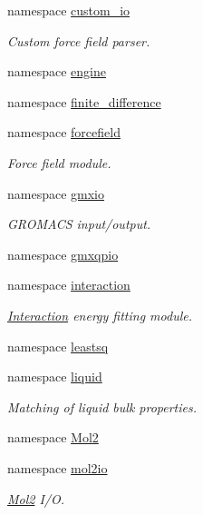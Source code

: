 \begin{DoxyCompactItemize}
namespace \hyperlink{namespaceforcebalance_1_1custom__io}{custom\-\_\-io}
\begin{DoxyCompactList}\small\item\em \-Custom force field parser. \end{DoxyCompactList}\item 
namespace \hyperlink{namespaceforcebalance_1_1engine}{engine}
\item 
namespace \hyperlink{namespaceforcebalance_1_1finite__difference}{finite\-\_\-difference}
\item 
namespace \hyperlink{namespaceforcebalance_1_1forcefield}{forcefield}
\begin{DoxyCompactList}\small\item\em \-Force field module. \end{DoxyCompactList}\item 
namespace \hyperlink{namespaceforcebalance_1_1gmxio}{gmxio}
\begin{DoxyCompactList}\small\item\em \-G\-R\-O\-M\-A\-C\-S input/output. \end{DoxyCompactList}\item 
namespace \hyperlink{namespaceforcebalance_1_1gmxqpio}{gmxqpio}
\item 
namespace \hyperlink{namespaceforcebalance_1_1interaction}{interaction}
\begin{DoxyCompactList}\small\item\em \hyperlink{classforcebalance_1_1interaction_1_1Interaction}{\-Interaction} energy fitting module. \end{DoxyCompactList}\item 
namespace \hyperlink{namespaceforcebalance_1_1leastsq}{leastsq}
\item 
namespace \hyperlink{namespaceforcebalance_1_1liquid}{liquid}
\begin{DoxyCompactList}\small\item\em \-Matching of liquid bulk properties. \end{DoxyCompactList}\item 
namespace \hyperlink{namespaceforcebalance_1_1Mol2}{\-Mol2}
\item 
namespace \hyperlink{namespaceforcebalance_1_1mol2io}{mol2io}
\begin{DoxyCompactList}\small\item\em \hyperlink{namespaceforcebalance_1_1Mol2}{\-Mol2} \-I/\-O. \end{DoxyCompactList}\item 

\end{DoxyCompactItemize}
